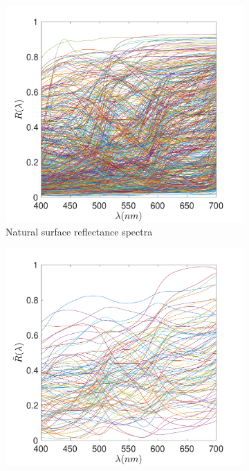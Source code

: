 \documentclass{jov}
\begin{document}
\begin{figure}
\centering
	\begin{subfigure}[b]{0.3 \textwidth}
    \centering
        \includegraphics[width=\textwidth]{../Figures/Figure7/Figure7_a.pdf}
        \caption{Natural surface reflectance spectra}
        \label{fig:naturalSurface}
    \end{subfigure}
    \begin{subfigure}[b]{0.3\textwidth}
    \centering
        \includegraphics[width=\textwidth]{../Figures/Figure7/Figure7_b.pdf}

\end{subfigure}
\end{figure}
\end{document}
